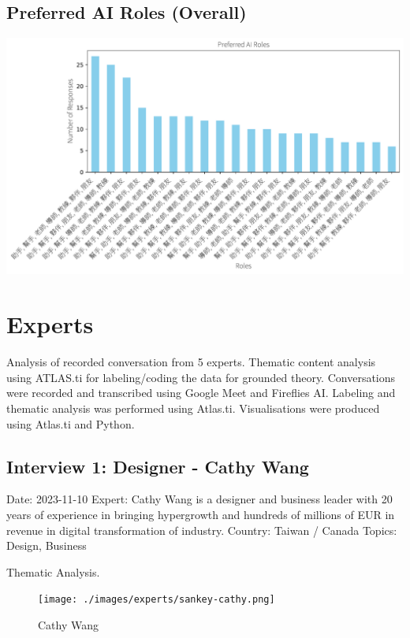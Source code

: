 \documentclass[
  letterpaper,
  DIV=11,
  numbers=noendperiod]{scrartcl}
\begin{document}
\subsection{Preferred AI Roles
(Overall)}\label{preferred-ai-roles-overall}

\includegraphics{_thesis_files/figure-pdf/cell-94-output-1.pdf}

\newpage

\section{Experts}\label{experts}

Analysis of recorded conversation from 5 experts. Thematic content
analysis using ATLAS.ti for labeling/coding the data for grounded
theory. Conversations were recorded and transcribed using Google Meet
and Fireflies AI. Labeling and thematic analysis was performed using
Atlas.ti. Visualisations were produced using Atlas.ti and Python.

\subsection{Interview 1: Designer - Cathy
Wang}\label{interview-1-designer---cathy-wang}

Date: 2023-11-10 Expert: Cathy Wang is a designer and business leader
with 20 years of experience in bringing hypergrowth and hundreds of
millions of EUR in revenue in digital transformation of industry.
Country: Taiwan / Canada Topics: Design, Business

Thematic Analysis.

\begin{figure}[H]

{\centering \texttt{[image: ./images/experts/sankey-cathy.png]}

}

\caption{Cathy Wang}

\end{figure}%
\end{document}
